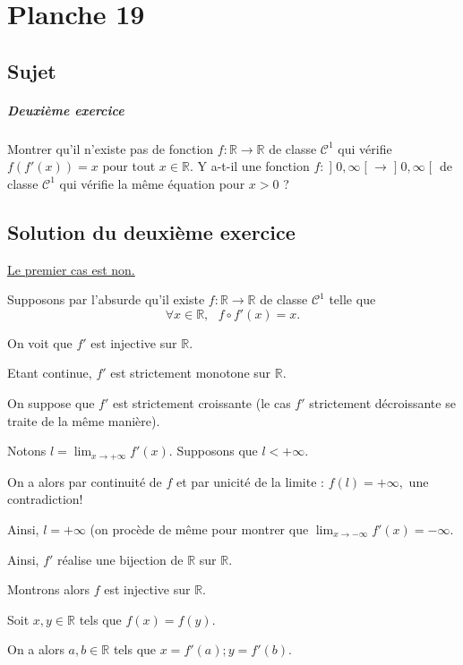 \chapter{Planche 19}


\section{Sujet}

\paragraph{Deuxième exercice}
Montrer qu'il n'existe pas de fonction $f : \mathbb R \to \mathbb R$ de classe $\mathscr C^1$ qui vérifie $f(f'(x)) = x$ pour tout $x \in \mathbb R$.
Y a-t-il une fonction $f : \mathopen]0,\infty\mathclose[ \to \mathopen]0,\infty\mathclose[$ de classe $\mathscr C^1$ qui vérifie la même équation pour $x > 0$ ?

\section{Solution du deuxième exercice}

\underline{Le premier cas est non.}

Supposons par l'absurde qu'il existe $f : \mathbb{R} \rightarrow \mathbb{R}$ de classe $\mathcal{C}^{1}$ telle que $$\forall x\in\mathbb{R},\mbox{ } f\circ f'(x)=x.$$

On voit que $f'$ est injective sur $\mathbb{R}$. 

Etant continue, $f'$ est strictement monotone sur $\mathbb{R}.$

On suppose que $f'$ est strictement croissante (le cas $f'$ strictement décroissante se traite de la même manière).

Notons $\displaystyle l=\lim_{x\rightarrow +\infty}f'(x).$ Supposons que $l<+\infty.$

On a alors par continuité de $f$ et par unicité de la limite : $\displaystyle f(l)=+\infty,$ une contradiction! 

Ainsi, $l=+\infty$ (on procède de même pour montrer que $\displaystyle \lim_{x\rightarrow -\infty}f'(x)=-\infty.$

Ainsi, $f'$ réalise une bijection de $\mathbb{R}$ sur $\mathbb{R}.$

Montrons alors $f$ est injective sur $\mathbb{R}.$

Soit $x,y\in\mathbb{R}$ tels que $f(x)=f(y).$ 

On a alors $a,b\in\mathbb{R}$ tels que $x=f'(a);y=f'(b).$

